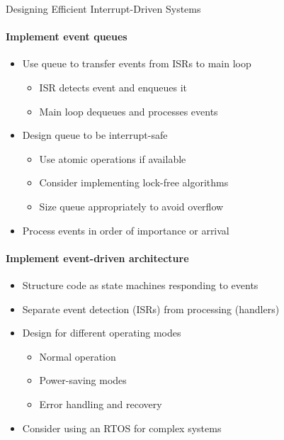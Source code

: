 \begin{KR}{Designing Efficient Interrupt-Driven Systems}
\paragraph{Implement event queues}
\begin{itemize}
    \item Use queue to transfer events from ISRs to main loop
    \begin{itemize}
        \item ISR detects event and enqueues it
        \item Main loop dequeues and processes events
    \end{itemize}
    \item Design queue to be interrupt-safe
    \begin{itemize}
        \item Use atomic operations if available
        \item Consider implementing lock-free algorithms
        \item Size queue appropriately to avoid overflow
    \end{itemize}
    \item Process events in order of importance or arrival
\end{itemize}

\paragraph{Implement event-driven architecture}
\begin{itemize}
    \item Structure code as state machines responding to events
    \item Separate event detection (ISRs) from processing (handlers)
    \item Design for different operating modes
    \begin{itemize}
        \item Normal operation
        \item Power-saving modes
        \item Error handling and recovery
    \end{itemize}
    \item Consider using an RTOS for complex systems
\end{itemize}
\end{KR}

